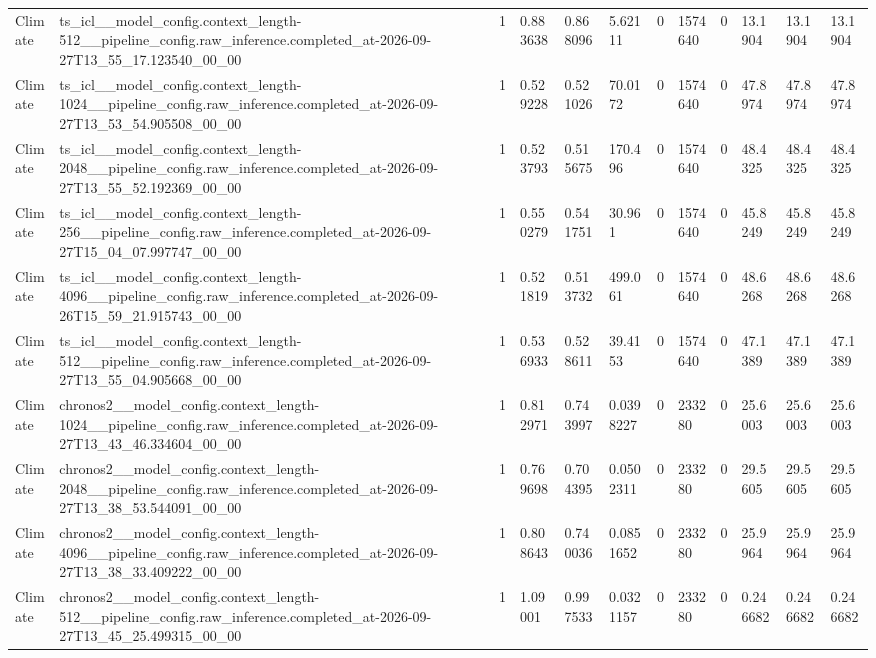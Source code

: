 \begin{tabular}{llllllllllll}
Climate & ts\_icl\_\_model\_config.context\_length-512\_\_pipeline\_config.raw\_inference.completed\_at-2026-09-27T13\_55\_17.123540\_00\_00 & 1 & 0.883638 & 0.868096 & 5.62111 & 0 & 1574640 & 0 & 13.1904 & 13.1904 & 13.1904 \\
Climate & ts\_icl\_\_model\_config.context\_length-1024\_\_pipeline\_config.raw\_inference.completed\_at-2026-09-27T13\_53\_54.905508\_00\_00 & 1 & 0.529228 & 0.521026 & 70.0172 & 0 & 1574640 & 0 & 47.8974 & 47.8974 & 47.8974 \\
Climate & ts\_icl\_\_model\_config.context\_length-2048\_\_pipeline\_config.raw\_inference.completed\_at-2026-09-27T13\_55\_52.192369\_00\_00 & 1 & 0.523793 & 0.515675 & 170.496 & 0 & 1574640 & 0 & 48.4325 & 48.4325 & 48.4325 \\
Climate & ts\_icl\_\_model\_config.context\_length-256\_\_pipeline\_config.raw\_inference.completed\_at-2026-09-27T15\_04\_07.997747\_00\_00 & 1 & 0.550279 & 0.541751 & 30.961 & 0 & 1574640 & 0 & 45.8249 & 45.8249 & 45.8249 \\
Climate & ts\_icl\_\_model\_config.context\_length-4096\_\_pipeline\_config.raw\_inference.completed\_at-2026-09-26T15\_59\_21.915743\_00\_00 & 1 & 0.521819 & 0.513732 & 499.061 & 0 & 1574640 & 0 & 48.6268 & 48.6268 & 48.6268 \\
Climate & ts\_icl\_\_model\_config.context\_length-512\_\_pipeline\_config.raw\_inference.completed\_at-2026-09-27T13\_55\_04.905668\_00\_00 & 1 & 0.536933 & 0.528611 & 39.4153 & 0 & 1574640 & 0 & 47.1389 & 47.1389 & 47.1389 \\
Climate & chronos2\_\_model\_config.context\_length-1024\_\_pipeline\_config.raw\_inference.completed\_at-2026-09-27T13\_43\_46.334604\_00\_00 & 1 & 0.812971 & 0.743997 & 0.0398227 & 0 & 233280 & 0 & 25.6003 & 25.6003 & 25.6003 \\
Climate & chronos2\_\_model\_config.context\_length-2048\_\_pipeline\_config.raw\_inference.completed\_at-2026-09-27T13\_38\_53.544091\_00\_00 & 1 & 0.769698 & 0.704395 & 0.0502311 & 0 & 233280 & 0 & 29.5605 & 29.5605 & 29.5605 \\
Climate & chronos2\_\_model\_config.context\_length-4096\_\_pipeline\_config.raw\_inference.completed\_at-2026-09-27T13\_38\_33.409222\_00\_00 & 1 & 0.808643 & 0.740036 & 0.0851652 & 0 & 233280 & 0 & 25.9964 & 25.9964 & 25.9964 \\
Climate & chronos2\_\_model\_config.context\_length-512\_\_pipeline\_config.raw\_inference.completed\_at-2026-09-27T13\_45\_25.499315\_00\_00 & 1 & 1.09001 & 0.997533 & 0.0321157 & 0 & 233280 & 0 & 0.246682 & 0.246682 & 0.246682 \\

\end{tabular}

